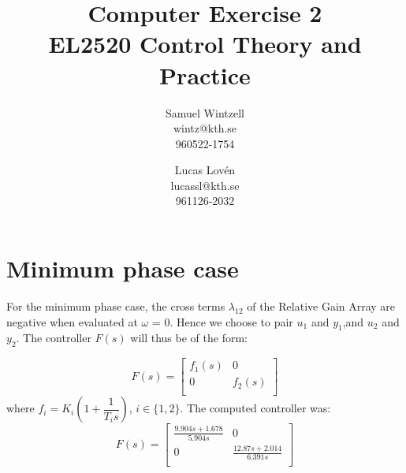 \documentclass[a4paper,11pt]{article}
\title{
	Computer Exercise 2\\
	EL2520 Control Theory and Practice
}
\author{
	Samuel Wintzell\\
	wintz@kth.se\\
	960522-1754
	\and
	Lucas Lov\'en \\ lucassl@kth.se  \\ 961126-2032
}
\begin{document}
	\maketitle

	\section*{Minimum phase case}
  
    For the minimum phase case, the cross terms $\lambda_{12}$ of the Relative Gain Array are negative when evaluated at $\omega$ = 0. Hence we choose to pair $u_1$ and $y_1$,and $u_2$ and $y_2$. The
    controller $F(s)$ will thus be of the form:

    \[
    F(s)=
    \begin{bmatrix}
      f_1(s) & 0      \\
      0      & f_2(s) \\
    \end{bmatrix}
    \]
    where $f_i = K_i (1 + \dfrac{1}{T_i s})$, $i \in \{1,2\}$. The computed controller was:
    \[
    F(s)=
    \begin{bmatrix}
     \frac{9.904s + 1.678}{5.904s} & 0      \\
      0      & \frac{12.87s + 2.014}{6.391s} \\
    \end{bmatrix}
    \]
\end{document}
